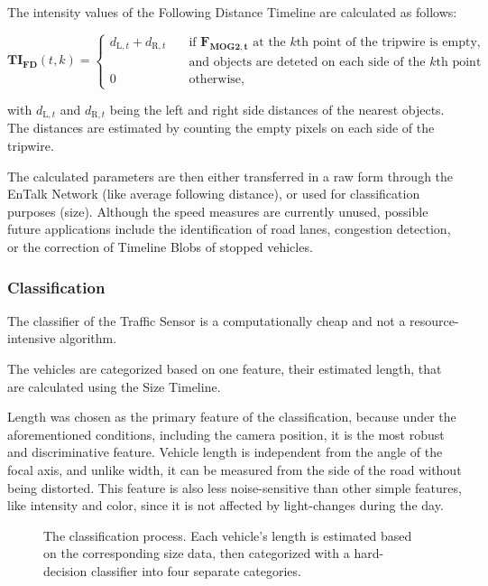 The intensity values of the Following Distance Timeline are calculated as follows:

\begin{displaymath}
\boldsymbol{TI_{\text{FD}}}(t,k) = 
\begin{cases}
d_{\text{L},t} + d_{\text{R},t} 		& \quad \text{if } \boldsymbol{F_{\text{MOG2},t}} \text{ at the } k\text{th} \text{ point of the tripwire is empty,} \\ & \quad \text{and objects are deteted on each side of the } k \text{th point}\\
0		& \quad \text{otherwise},
\end{cases}
\end{displaymath}

with $d_{\text{L},t}$ and $d_{\text{R},t}$ being the left and right side distances of the nearest objects.
The distances are estimated by counting the empty pixels on each side of the tripwire.

The calculated parameters are then either transferred in a raw form through the EnTalk Network (like average following distance), or used for classification purposes (size).
Although the speed measures are currently unused, possible future applications include the identification of road lanes, congestion detection, or the correction of Timeline Blobs of stopped vehicles.

\subsubsection{Classification}
The classifier of the Traffic Sensor is a computationally cheap and not a resource-intensive algorithm.

The vehicles are categorized based on one feature, their estimated length, that are calculated using the Size Timeline.

Length was chosen as the primary feature of the classification, because under the aforementioned conditions, including the camera position, it is the most robust and discriminative feature.
Vehicle length is independent from the angle of the focal axis, and unlike width, it can be measured from the side of the road without being distorted.
This feature is also less noise-sensitive than other simple features, like intensity and color, since it is not affected by light-changes during the day.

\begin{figure}[!h]
	\centering
	
	\caption{The classification process. Each vehicle's length is estimated based on the corresponding size data, then categorized with a hard-decision classifier into four separate categories. \label{fig:classification}}
\end{figure}

